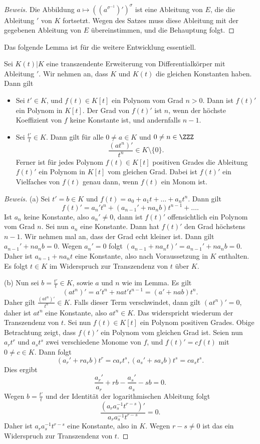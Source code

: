 \documentclass[12pt,a4paper,twoside]{article}
\begin{document}
\begin{proof}[Beweis]
  Die Abbildung $a\mapsto ((a^{\sigma^{-1}})')^\sigma$ ist eine Ableitung von
  $E$, die die Ableitung $'$ von $K$ fortsetzt. Wegen des Satzes muss diese
  Ableitung mit der gegebenen Ableitung von $E$ \"ubereinstimmen, und die
  Behauptung folgt.
\end{proof}
Das folgende Lemma ist f\"ur die weitere Entwicklung essentiell.
\begin{Lemma}
  Sei $K(t)|K$ eine transzendente Erweiterung von Differentialk\"orper mit
  Ableitung $'$. Wir nehmen an, dass $K$ und $K(t)$ die gleichen Konstanten
  haben. Dann gilt
  \begin{itemize}
  \item[(a)] Sei $t'\in K$, und $f(t)\in K[t]$ ein Polynom vom Grad $n>0$.
    Dann ist $f(t)'$ ein Polynom in $K[t]$. Der Grad von $f(t)'$ ist $n$, wenn
    der h\"ochste Koeffizient von $f$ keine Konstante ist, und andernfalls
    $n-1$.
  \item[(b)] Sei $\frac{t'}{t}\in K$. Dann gilt f\"ur alle $0\ne a\in K$ und
    $0\ne n\in\ZZZ$
\[
\frac{(at^n)'}{t^n}\in K\setminus\{0\}.
\]
Ferner ist f\"ur jedes Polynom $f(t)\in K[t]$ positiven Grades die Ableitung
$f(t)'$ ein Polynom in $K[t]$ vom gleichen Grad. Dabei ist $f(t)'$ ein
Vielfaches von $f(t)$ genau dann, wenn $f(t)$ ein Monom ist.
  \end{itemize}
\end{Lemma}
\begin{proof}[Beweis]
(a) Sei $t'=b\in K$ und $f(t)=a_0+a_1t+\dots+a_nt^n$. Dann gilt
\[
f(t)'=a_n't^n+(a_{n-1}'+na_nb)t^{n-1}+\dots.
\]
Ist $a_n$ keine Konstante, also $a_n'\ne0$, dann ist $f(t)'$ offensichtlich
ein Polynom vom Grad $n$. Sei nun $a_n$ eine Konstante. Dann hat $f(t)'$ den
Grad h\"ochstens $n-1$. Wir nehmen mal an, dass der Grad echt kleiner
ist. Dann gilt $a_{n-1}'+na_nb=0$. Wegen $a_n'=0$ folgt
$(a_{n-1}+na_nt)'=a_{n-1}'+na_nb=0$. Daher ist $a_{n-1}+na_nt$ eine Konstante,
also nach Voraussetzung in $K$ enthalten. Es folgt $t\in K$ im Widerspruch zur
Transzendenz von $t$ \"uber $K$.

(b) Nun sei $b=\frac{t'}{t}\in K$, sowie $a$ und $n$ wie im Lemma. Es gilt
\[
(at^n)'=a't^n+nat't^{n-1}=(a'+nab)t^n.
\]
Daher gilt $\frac{(at^n)'}{t^n}\in K$. Falls dieser Term verschwindet, dann
gilt $(at^n)'=0$, daher ist $at^n$ eine Konstante, also $at^n\in K$. Das
widerspricht wiederum der Transzendenz von $t$. Sei nun $f(t)\in K[t]$ ein
Polynom positiven Grades. Obige Betrachtung zeigt, dass $f(t)'$ ein Polynom
vom gleichen Grad ist. Seien nun $a_rt^r$ und $a_st^s$ zwei verschiedene
Monome von $f$, und $f(t)'=cf(t)$ mit $0\ne c\in K$. Dann folgt
\[
(a_r'+ra_rb)t^r=ca_rt^s, (a_s'+sa_sb)t^s=ca_st^s.
\]
Dies ergibt
\[
\frac{a_r'}{a_r}+rb-\frac{a_s'}{a_s}-sb=0.
\]
Wegen $b=\frac{t'}{t}$ und der Identit\"at der logarithmischen Ableitung folgt
\[
\frac{(a_ra_s^{-1}t^{r-s})'}{a_ra_s^{-1}t^{r-s}}=0.
\]
Daher ist $a_ra_s^{-1}t^{r-s}$ eine Konstante, also in $K$. Wegen $r-s\ne0$
ist das ein Widerspruch zur Transzendenz von $t$.
\end{proof}
\end{document}
